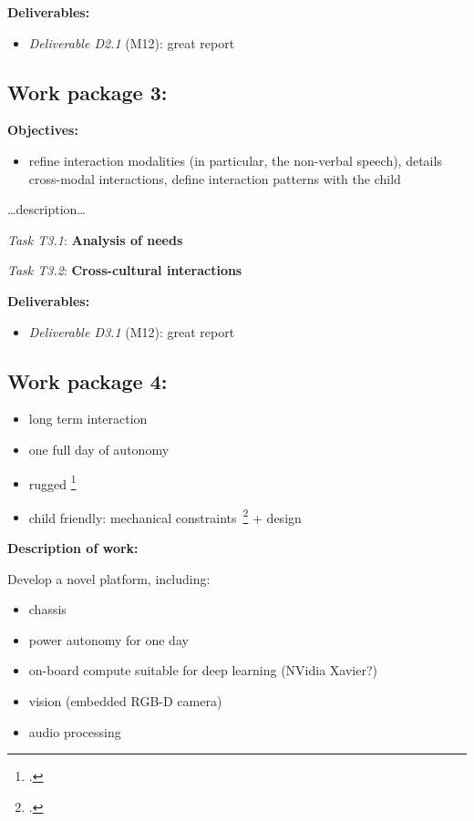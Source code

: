 \documentclass[11pt]{report}
\newcommand{\task}[2]{\vspace{0.5cm}\noindent\emph{Task T#1}: {\bf #2}\par}
\newcommand{\D}[3]{\emph{Deliverable D#1} (M#2): #3\\}
\begin{document}
\vspace{0.5cm}\textbf{Deliverables:}

\begin{itemize}
    \item \D{2.1}{12}{great report}
\end{itemize}

\subsection{Work package 3: \wpThree}

\textbf{Objectives:}

\begin{itemize}
    \item refine interaction modalities (in
    particular, the non-verbal speech), details cross-modal interactions,
    define interaction patterns with the child
\end{itemize}

\ldots{}description\ldots{}

\task{3.1}{Analysis of needs}
\task{3.2}{Cross-cultural interactions}

\vspace{0.5cm}\textbf{Deliverables:}

\begin{itemize}
    \item \D{3.1}{12}{great report}
\end{itemize}

\subsection{Work package 4: \wpFour}


\begin{itemize}
    \item long term interaction
    \item one full day of autonomy
    \item rugged \footcite{ozgur2017cellulo, hostettler2016realtime}
    \item child friendly: mechanical constraints~\footcite{ozgur2016permanent} + design
\end{itemize}


\textbf{Description of work:}

Develop a novel platform, including:

\begin{itemize}
    \item chassis
    \item power autonomy for one day
    \item on-board compute suitable for deep learning (NVidia Xavier?)
    \item vision (embedded RGB-D camera)
    \item audio processing
\end{itemize}
\end{document}
